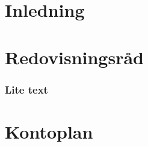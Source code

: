 \documentclass[%
	a4paper,
	twoside,
	titlepage,
	swedish,
	]{scrbook}
\begin{document}
\tableofcontents	%


\mainmatter
\part{Inledning}


\part{Redovisningsråd}
\section{Lite text}

\backmatter
\part{Kontoplan}

\end{document}
